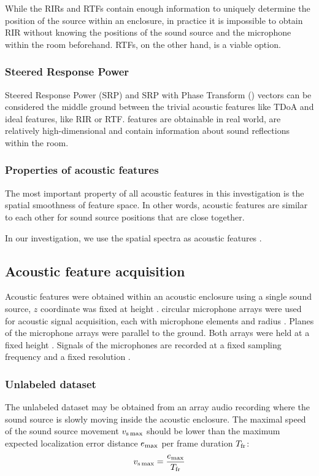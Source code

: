\documentclass[applsci,article,submit,moreauthors,pdftex]{Definitions/mdpi}
\begin{document}
While the RIRs and RTFs contain enough information to uniquely determine the position of the source within an enclosure, in practice it is impossible to obtain RIR without knowing the positions of the sound source and the microphone within the room beforehand. RTFs, on the other hand, is a viable option.

\subsubsection{Steered Response Power}
Steered Response Power (SRP) and SRP with Phase Transform (\srpphat{}) vectors can be considered the middle ground between the trivial acoustic features like TDoA and ideal features, like RIR or RTF. 
\srpphat{} features are obtainable in real world, are relatively high-dimensional and contain information about sound reflections within the room.

\subsubsection{Properties of acoustic features}
The most important property of all acoustic features in this investigation is the spatial smoothness of feature space. In other words, acoustic features are similar to each other for sound source positions that are close together.

In our investigation, we use the \srpphat{} spatial spectra as acoustic features \cite{dibiaseHighaccuracyLowlatencyTechnique2000,scheiblerPyroomacousticsPythonPackage2018a}. 

\subsection{Acoustic feature acquisition}
Acoustic features were obtained within an acoustic enclosure using a single sound source, $ z $ coordinate was fixed at height \hsrc{}. \Narr{} circular microphone arrays were used for acoustic signal acquisition, each with \Nmic{} microphone elements and radius \rarr{}.
Planes of the microphone arrays were parallel to the ground.
Both arrays were held at a fixed height \harr{}.
Signals of the microphones are recorded at a fixed sampling frequency \fs{} and a fixed resolution \resolution{}.

\subsubsection{Unlabeled dataset}
The unlabeled dataset may be obtained from an array audio recording where the sound source is slowly moving inside the acoustic enclosure. The maximal speed of the sound source movement $ v_{\mathrm{s}\max} $ should be lower than the maximum expected localization error distance $ e_{\max} $ per frame duration $ T_{\mathrm{fr}} $:
\begin{equation}\label{eq:unlabeled_src_max_speed}
v_{\mathrm{s}\max}  = \frac{e_{\max}}{T_{\mathrm{fr}}}
\end{equation} 
\end{document}

